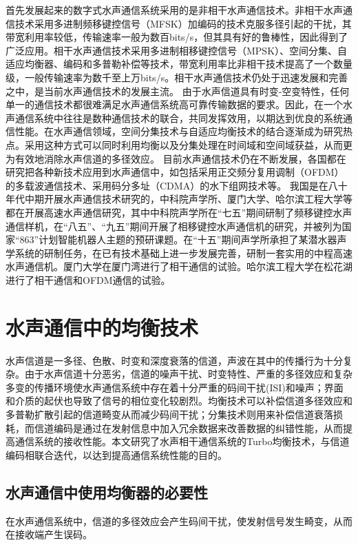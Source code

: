 首先发展起来的数字式水声通信系统采用的是非相干水声通信技术。非相干水声通信技术采用多进制频移键控信号（MFSK）加编码的技术克服多径引起的干扰，其带宽利用率较低，传输速率一般为数百bits/s，但其具有好的鲁棒性，因此得到了广泛应用。相干水声通信技术采用多进制相移键控信号（MPSK）、空间分集、自适应均衡器、编码和多普勒补偿等技术，带宽利用率比非相干技术提高了一个数量级，一般传输速率为数千至上万bits/s。相干水声通信技术仍处于迅速发展和完善之中，是当前水声通信技术的发展主流。
由于水声信道具有时变-空变特性，任何单一的通信技术都很难满足水声通信系统高可靠传输数据的要求。因此，在一个水声通信系统中往往是数种通信技术的联合，共同发挥效用，以期达到优良的系统通信性能。在水声通信领域，空间分集技术与自适应均衡技术的结合逐渐成为研究热点。采用这种方式可以同时利用均衡以及分集处理在时间域和空间域获益，从而更为有效地消除水声信道的多径效应。
目前水声通信技术仍在不断发展，各国都在研究把各种新技术应用到水声通信中，如包括采用正交频分复用调制（OFDM）的多载波通信技术、采用码分多址（CDMA）的水下组网技术等\citep{Sozer2000,Rice2000,zhuweiqing1998}。
我国是在八十年代中期开展水声通信技术研究的，中科院声学所、厦门大学、哈尔滨工程大学等都在开展高速水声通信研究，其中中科院声学所在“七五”期间研制了频移键控水声通信样机，在“八五”、“九五”期间开展了相移键控水声通信机的研究\citep{zhuweiqing1998}，并被列为国家“863”计划智能机器人主题的预研课题。在“十五”期间声学所承担了某潜水器声学系统的研制任务，在已有技术基础上进一步发展完善，研制一套实用的中程高速水声通信机。厦门大学在厦门湾进行了相干通信的试验\citep{TXU1997}。哈尔滨工程大学在松花湖进行了相干通信和OFDM通信的试验。
\section{水声通信中的均衡技术}
水声信道是一多径、色散、时变和深度衰落的信道，声波在其中的传播行为十分复杂。由于水声信道十分恶劣，信道的噪声干扰、时变特性、严重的多径效应和复杂多变的传播环境使水声通信系统中存在着十分严重的码间干扰(ISI)和噪声；界面和介质的起伏也导致了信号的相位变化较剧烈。均衡技术可以补偿信道多径效应和多普勒扩散引起的信道畸变从而减少码间干扰；分集技术则用来补偿信道衰落损耗，而信道编码是通过在发射信息中加入冗余数据来改善数据的纠错性能，从而提高通信系统的接收性能。本文研究了水声相干通信系统的Turbo均衡技术，与信道编码相联合迭代，以达到提高通信系统性能的目的。
\subsection{水声通信中使用均衡器的必要性}
在水声通信系统中，信道的多径效应会产生码间干扰，使发射信号发生畸变，从而在接收端产生误码。

